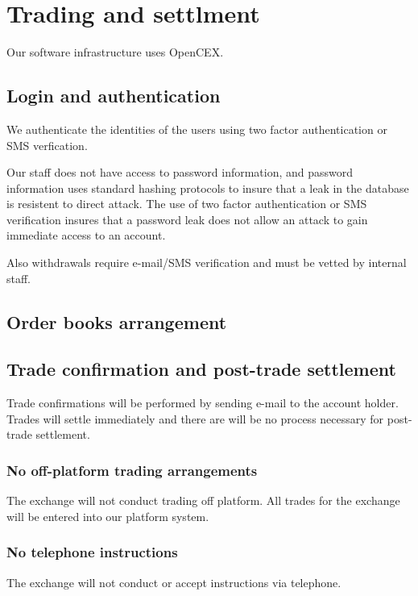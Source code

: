 \section{Trading and settlment}
Our software infrastructure uses OpenCEX.

\subsection{Login and authentication}

We authenticate the identities of the users using two factor
authentication or SMS verfication.

Our staff does not have access to password information, and password
information uses standard hashing protocols to insure that a leak in
the database is resistent to direct attack.  The use of two factor
authentication or SMS verification insures that a password leak does
not allow an attack to gain immediate access to an account.

Also withdrawals require e-mail/SMS verification and must be vetted by
internal staff.

\subsection{Order books arrangement}



\subsection{Trade confirmation and post-trade settlement}

Trade confirmations will be performed by sending e-mail to the account
holder.  Trades will settle immediately and there are will be no
process necessary for post-trade settlement.

\subsubsection{No off-platform trading arrangements}
The exchange will not conduct trading off platform.  All trades for
the exchange will be entered into our platform system.

\subsubsection{No telephone instructions}
The exchange will not conduct or accept instructions via telephone.


